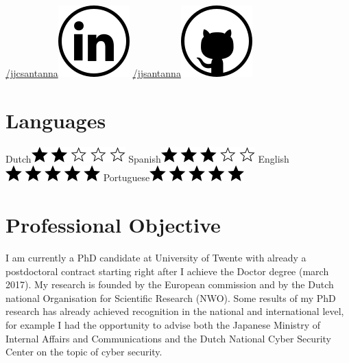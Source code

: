 \documentclass[print]{styles/friggeri-cv-mac} %
\begin{document}
\begin{aside}
\href{https://www.linkedin.com/in/jjcsantanna}{/jjcsantanna}\includegraphics[scale=0.3]{img/linkedin.png}
\href{https://github.com/jjsantanna}{/jjsantanna\includegraphics[scale=0.3]{img/github.png}}
~
\section{Languages}
Dutch\includegraphics[scale=0.40]{img/2stars.png}
Spanish\includegraphics[scale=0.40]{img/3stars.png}
English\includegraphics[scale=0.40]{img/5stars.png}
Portuguese\includegraphics[scale=0.40]{img/5stars.png}
\end{aside}

\section{Professional Objective}\vspace{-10pt}
\setlength\parindent{12pt}I am currently a PhD candidate at University of
Twente with already a postdoctoral contract starting right after I achieve the
Doctor degree (march 2017). My research is founded by the European commission
and by the Dutch national Organisation for Scientific Research (NWO). Some
results of my PhD research has already achieved recognition in the national and
international level, for example I had the opportunity to advise both the
Japanese Ministry of Internal Affairs and Communications and the Dutch National
Cyber Security Center on the topic of cyber security. 
\end{document}
